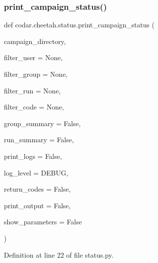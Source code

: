 \subsubsection{\texorpdfstring{print\+\_\+campaign\+\_\+status()}{print\_campaign\_status()}}
{\footnotesize\ttfamily def codar.\+cheetah.\+status.\+print\+\_\+campaign\+\_\+status (\begin{DoxyParamCaption}\item[{}]{campaign\+\_\+directory,  }\item[{}]{filter\+\_\+user = {\ttfamily None},  }\item[{}]{filter\+\_\+group = {\ttfamily None},  }\item[{}]{filter\+\_\+run = {\ttfamily None},  }\item[{}]{filter\+\_\+code = {\ttfamily None},  }\item[{}]{group\+\_\+summary = {\ttfamily False},  }\item[{}]{run\+\_\+summary = {\ttfamily False},  }\item[{}]{print\+\_\+logs = {\ttfamily False},  }\item[{}]{log\+\_\+level = {\ttfamily \textquotesingle{}DEBUG\textquotesingle{}},  }\item[{}]{return\+\_\+codes = {\ttfamily False},  }\item[{}]{print\+\_\+output = {\ttfamily False},  }\item[{}]{show\+\_\+parameters = {\ttfamily False} }\end{DoxyParamCaption})}



Definition at line 22 of file status.\+py.

